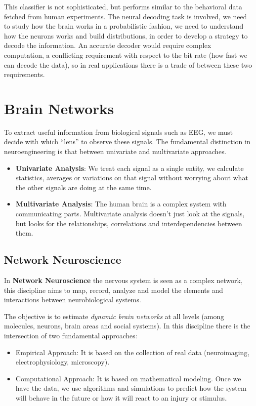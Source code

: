 \documentclass[10pt, letterpaper]{report}
\begin{document}
This classifier is not sophisticated, but performs similar to the behavioral data fetched from human experiments. The neural decoding task is involved, we need to study how the brain works in a probabilistic fashion, we need to understand how the neurons works and build distributions, in order to develop a strategy to decode the information. An accurate decoder would require complex computation, a conflicting requirement with respect to the bit rate (how fast we can decode the data), so in real applications there is a trade of between these two requirements.
\chapter{Brain Networks}
To extract useful information from biological signals such as EEG, we must decide with which ``lens'' to observe these signals. The fundamental distinction in neuroengineering is that between univariate and multivariate approaches.\begin{itemize}
     \item \textbf{Univariate Analysis}: We treat each signal as a single entity, we calculate statistics, averages or variations on that signal without worrying about what the other signals are doing at the same time.
     \item \textbf{Multivariate Analysis}: The human brain is a complex system with communicating parts. Multivariate analysis doesn't just look at the signals, but looks for the relationships, correlations and interdependencies between them.
\end{itemize}
\section{Network Neuroscience}
In \textbf{Network Neuroscience} the nervous system is seen as a complex network, this discipline aims to map, record, analyze and model the elements and interactions between neurobiological systems.

The objective is to estimate \textit{dynamic brain networks} at all levels  (among molecules, neurons, brain areas and social systems). In this discipline there is the intersection of two fundamental approaches:\begin{itemize}
     \item Empirical Approach: It is based on the collection of real data (neuroimaging, electrophysiology, microscopy).
     \item Computational Approach: It is based on mathematical modeling. Once we have the data, we use algorithms and simulations to predict how the system will behave in the future or how it will react to an injury or stimulus.
\end{itemize}
\end{document}
